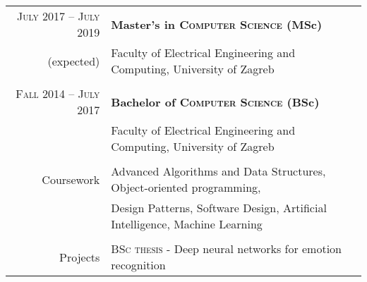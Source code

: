 \documentclass[a4paper,10pt]{article} %
\begin{document}
\begin{tabular}{rl}
    \textsc{July 2017 -- July 2019} & \textbf{Master's in \textsc{Computer Science} (MSc)} \\
    \footnotesize{      (expected)} & \footnotesize{Faculty of Electrical Engineering and Computing, University of Zagreb} \\
                                    \\

    \textsc{Fall 2014 -- July 2017} & \textbf{Bachelor of \textsc{Computer Science} (BSc)} \\
                                    & \footnotesize{Faculty of Electrical Engineering and Computing, University of Zagreb} \\
                                    \\

    Coursework & \footnotesize{Advanced Algorithms and Data Structures, Object-oriented programming,} \\
               & \footnotesize{Design Patterns, Software Design, Artificial Intelligence, Machine Learning} \\
               \\

    Projects & \footnotesize{\textsc{BSc thesis} - Deep neural networks for emotion recognition} \\
\end{tabular}

\vspace{5mm}




\end{document}
